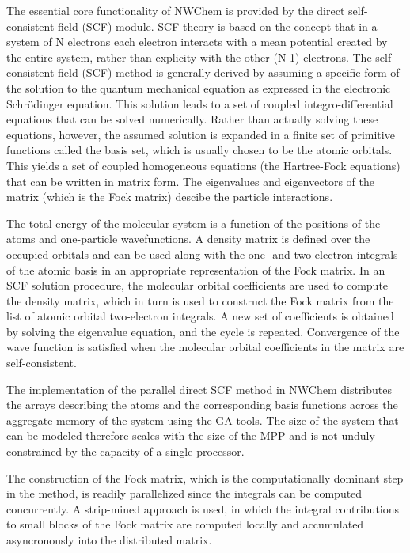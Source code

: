 The essential core functionality of NWChem is provided by the direct self-consistent field
(SCF) module.  SCF theory is based on the concept that in a system of N electrons 
each electron interacts with a
mean potential created by the entire system, rather than 
explicity with the other (N-1) electrons.
The self-consistent field (SCF) method is generally derived by assuming a specific
form of the solution to the quantum mechanical equation as expressed in the
electronic Schr\"{o}dinger equation.  This solution leads to a set of
coupled integro-differential equations
that can be solved numerically.
Rather than actually solving these equations, however, the assumed solution is
expanded in a finite set of primitive functions called the basis set, which is
usually chosen to be the
atomic orbitals.  This yields
a set of coupled homogeneous equations (the Hartree-Fock equations) that can be
written in matrix form.  The eigenvalues and eigenvectors of the matrix (which is
the Fock matrix) descibe the particle interactions.

The total energy of the molecular system is a function of the positions of the atoms
and one-particle wavefunctions.
A density matrix is defined over the occupied orbitals and can be used along
with the one- and two-electron integrals of the atomic basis in an appropriate 
representation of the Fock matrix.  In an SCF solution procedure, the molecular
orbital coefficients are used to compute the density matrix, which in turn is
used to construct the Fock matrix from the list of atomic orbital two-electron
integrals.  A new set of coefficients is obtained by solving the eigenvalue
equation, and the cycle is repeated.  Convergence of the wave function is
satisfied when the molecular orbital coefficients in the matrix are self-consistent.

The implementation of the parallel direct SCF method in NWChem 
distributes the arrays describing the atoms and the corresponding basis
functions across the aggregate memory of the system using the GA tools.
The size of the system that can be modeled therefore scales with the
size of the MPP and is not unduly constrained by the capacity of a single
processor.

The construction of the Fock matrix, which is the computationally dominant
step in the method, is readily parallelized since the integrals can
be computed concurrently.  A strip-mined approach is used, in which
the integral contributions to small blocks of the Fock matrix are
computed locally and accumulated asyncronously into the distributed matrix.

